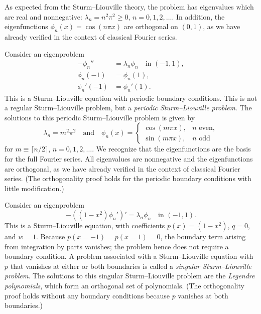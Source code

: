 \begin{example}
\begin{itemize}
    \end{itemize}
    As expected from the Sturm--Liouville theory, the problem has eigenvalues which are real and nonnegative: $\lambda_n = n^2\pi^2 \geq 0$, $n = 0, 1, 2, \dots$. In addition, the eigenfunctions $\phi_n(x) = \cos(n\pi x)$ are orthogonal on $(0, 1)$, as we have already verified in the context of classical Fourier series.
\end{example}

\begin{example}
    Consider an eigenproblem
    \begin{align*}
        -\phi_n'' &= \lambda_n \phi_n \quad \text{in } (-1, 1), \\
        \phi_n(-1) &= \phi_n(1), \\
        \phi_n'(-1) &= \phi_n'(1).
    \end{align*}
    This is a Sturm--Liouville equation with periodic boundary conditions. This is not a regular Sturm--Liouville problem, but a \textit{periodic Sturm--Liouville problem}. The solutions to this periodic Sturm--Liouville problem is given by
    \[\lambda_n = m^2\pi^2 \quad \text{and} \quad \phi_n(x) = \begin{cases} \cos(m\pi x), & n \text{ even}, \\ \sin(m\pi x), & n \text{ odd} \end{cases}\]
    for $m \equiv \lceil n/2 \rceil$, $n = 0, 1, 2, \dots$. We recognize that the eigenfunctions are the basis for the full Fourier series. All eigenvalues are nonnegative and the eigenfunctions are orthogonal, as we have already verified in the context of classical Fourier series. (The orthogonality proof holds for the periodic boundary conditions with little modification.)
\end{example}

\begin{example}
    Consider an eigenproblem
    \[-((1 - x^2)\phi_n')' = \lambda_n \phi_n \quad \text{in } (-1, 1).\]
    This is a Sturm--Liouville equation, with coefficients $p(x) = (1 - x^2)$, $q = 0$, and $w = 1$. Because $p(x = -1) = p(x = 1) = 0$, the boundary term arising from integration by parts vanishes; the problem hence does not require a boundary condition. A problem associated with a Sturm--Liouville equation with $p$ that vanishes at either or both boundaries is called a \textit{singular Sturm--Liouville problem}. The solutions to this singular Sturm--Liouville problem are the \textit{Legendre polynomials}, which form an orthogonal set of polynomials. (The orthogonality proof holds without any boundary conditions because $p$ vanishes at both boundaries.)
\end{example}

